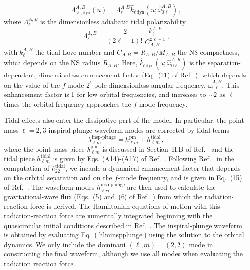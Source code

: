 \documentclass[prd,aps,letter,twocolumn,floatfix,notitlepage,nofootinbib]{revtex4-1}
\begin{document}
\begin{equation}
\Lambda_{\ell,\textrm{dyn}}^{A,B}(u)=\Lambda_{\ell}^{A,B}\hat{k}_{\ell\,\textrm{dyn}}(u;\hat{\omega}_{0\ell}^{A,B})\,,
\end{equation}
where $\Lambda_{\ell}^{A,B}$ is the dimensionless adiabatic tidal polarizability
\begin{equation}
\Lambda_{\ell}^{A,B}=\frac{2}{(2\ell-1)!!}\frac{k^{A,B}_{\ell}}{C_{A,B}^{2\ell+1}}\,,
\end{equation}
with $k^{A,B}_{\ell}$ the tidal Love number and $C_{A,B}=R_{A,B}/M_{A,B}$ the NS compactness, which depends on the NS radius $R_{A,B}$. Here, $\hat{k}_{\ell\,\textrm{dyn}}(u;\hat{\omega}_{0\ell}^{A,B})$ is the separation-dependent, dimensionless enhancement factor (Eq.~(11) of Ref.~\cite{Dietrich:2017feu}), which depends on the value of the $f$-mode $2^\ell$-pole dimensionless angular frequency, $\hat{\omega}_{0\ell}^{A,B}$. This enhancement factor is 1 for low orbital frequencies, and increases to $\sim 2$ as $\ell$ times the orbital frequency approaches the $f$-mode frequency. 

Tidal effects also enter the dissipative part of the model. In particular, the point-mass $\ell=2,3$ inspiral-plunge waveform modes are corrected by tidal terms
\begin{equation}
h_{\ell m}^{\textrm{insp-plunge}} = h_{\ell m}^{\textrm{pm}} + h_{\ell m}^{\textrm{tidal}}\,,\label{hlminspplunge}
\end{equation} 
where the point-mass piece $h_{\ell m}^{\textrm{pm}}$ is discussed in Section~II.B of Ref.~\cite{Bohe:2016gbl} and the tidal piece $h_{\ell m}^{\textrm{tidal}}$ is given by Eqs. (A14)-(A17) of Ref.~\cite{Damour:2012yf}. Following Ref.~\cite{Dietrich:2017feu} in the computation of $h_{22}^{\textrm{tidal}}$, we include a dynamical enhancement factor that depends on the orbital separation and on the $f$-mode frequency, and is given in Eq.~(15) of Ref.~\cite{Dietrich:2017feu}. The waveform modes $h_{\ell m}^{\textrm{insp-plunge}}$ are then used to calculate the gravitational-wave flux (Eqs.~(5) and~(6) of Ref.~\cite{Dietrich:2017feu}) from which the radiation-reaction force is derived. The Hamiltonian equations of motion with this radiation-reaction force are numerically integrated beginning with the quasicircular initial conditions described in Ref.~\cite{Buonanno:2005xu}. The inspiral-plunge waveform is obtained by evaluating Eq.~(\ref{hlminspplunge}) using the solution to the orbital dynamics. We only include the dominant $(\ell,m)=(2,2)$ mode in constructing the final waveform, although we use all modes when evaluating the radiation reaction force.
\end{document}
